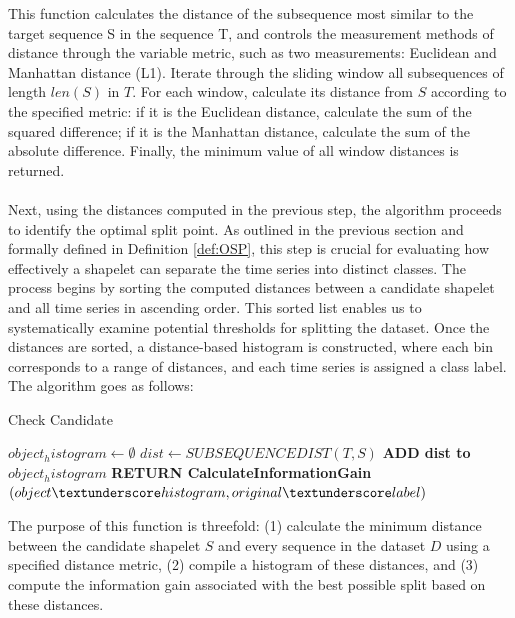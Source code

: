\noindent This function calculates the distance of the subsequence most similar to the target sequence S in the sequence T, and controls the measurement methods of distance through the variable metric, such as two measurements: Euclidean and Manhattan distance (L1). Iterate through the sliding window all subsequences of length $len(S)$ in $T$. For each window, calculate its distance from $S$ according to the specified metric: if it is the Euclidean distance, calculate the sum of the squared difference; if it is the Manhattan distance, calculate the sum of the absolute difference. Finally, the minimum value of all window distances is returned.\\
\\
Next, using the distances computed in the previous step, the algorithm proceeds to identify the optimal split point. As outlined in the previous section and formally defined in Definition \ref{def:OSP}, this step is crucial for evaluating how effectively a shapelet can separate the time series into distinct classes. The process begins by sorting the computed distances between a candidate shapelet and all time series in ascending order. This sorted list enables us to systematically examine potential thresholds for splitting the dataset. Once the distances are sorted, a distance-based histogram is constructed, where each bin corresponds to a range of distances, and each time series is assigned a class label. The algorithm goes as follows:\\
\begin{algorithm}[H]
	\caption{Check Candidate}
	\begin{algorithmic}[1]{
			\State $object_histogram \gets \emptyset$
			\State $dist \gets SUBSEQUENCEDIST(T,S)$
			\State \textbf{ADD dist to} $object_histogram$
			\EndFor
			\State \textbf{RETURN CalculateInformationGain}$(object\textunderscore histogram, original\textunderscore label)$
			\EndProcedure
		}
	\end{algorithmic}
	\label{al:checkcandidate}
\end{algorithm}
\noindent The purpose of this function is threefold: (1) calculate the minimum distance between the candidate shapelet $S$ and every sequence in the dataset $D$ using a specified distance metric, (2) compile a histogram of these distances, and (3) compute the information gain associated with the best possible split based on these distances.\\
